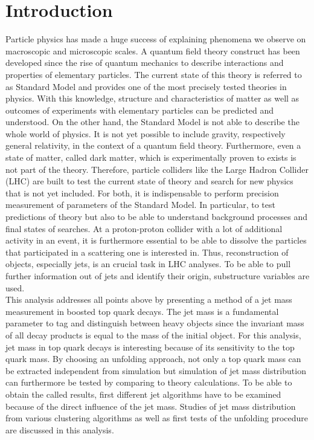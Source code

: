 \chapter{Introduction}
	Particle physics has made a huge success of explaining phenomena we observe on macroscopic and microscopic scales. A quantum field theory construct has been developed since the rise of quantum mechanics to describe interactions and properties of elementary particles. The current state of this theory is referred to as Standard Model and provides one of the most precisely tested theories in physics. With this knowledge, structure and characteristics of matter as well as outcomes of experiments with elementary particles can be predicted and understood. On the other hand, the Standard Model is not able to describe the whole world of physics. It is not yet possible to include gravity, respectively general relativity, in the context of a quantum field theory. Furthermore, even a state of matter, called dark matter, which is experimentally proven to exists is not part of the theory. Therefore, particle colliders like the Large Hadron Collider (LHC) are built to test the current state of theory and search for new physics that is not yet included. For both, it is indispensable to perform precision measurement of parameters of the Standard Model. In particular, to test predictions of theory but also to be able to understand background processes and final states of searches. At a proton-proton collider with a lot of additional activity in an event, it is furthermore essential to be able to dissolve the particles that participated in a scattering one is interested in. Thus, reconstruction of objects, especially jets, is an crucial task in LHC analyses. To be able to pull further information out of jets and identify their origin, substructure variables are used. \\
	This analysis addresses all points above by presenting a method of a jet mass measurement in boosted top quark decays. The jet mass is a fundamental parameter to tag and distinguish between heavy objects since the invariant mass of all decay products is equal to the mass of the initial object. For this analysis, jet mass in top quark decays is interesting because of its sensitivity to the top quark mass. By choosing an unfolding approach, not only a top quark mass can be extracted independent from simulation but simulation of jet mass distribution can furthermore be tested by comparing to theory calculations. To be able to obtain the called results, first different jet algorithms have to be examined because of the direct influence of the jet mass. Studies of jet mass distribution from various clustering algorithms as well as first tests of the unfolding procedure are discussed in this analysis.
